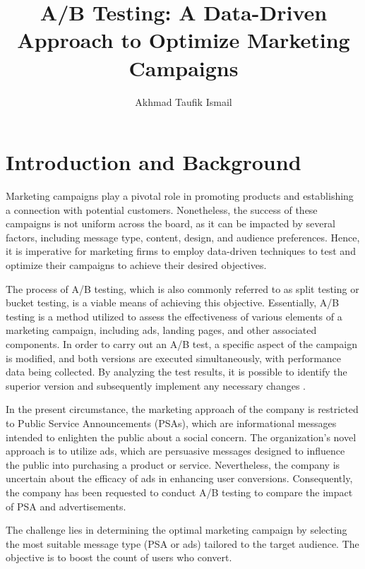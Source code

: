 \documentclass{article}
\begin{document}
\title{A/B Testing: A Data-Driven Approach to Optimize Marketing Campaigns}
\author{Akhmad Taufik Ismail}
\maketitle

\section{Introduction and Background} 

Marketing campaigns play a pivotal role in promoting products and establishing a connection with potential customers. Nonetheless, the success of these campaigns is not uniform across the board, as it can be impacted by several factors, including message type, content, design, and audience preferences. Hence, it is imperative for marketing firms to employ data-driven techniques to test and optimize their campaigns to achieve their desired objectives. 

The process of A/B testing, which is also commonly referred to as split testing or bucket testing, is a viable means of achieving this objective. Essentially, A/B testing is a method utilized to assess the effectiveness of various elements of a marketing campaign, including ads, landing pages, and other associated components. In order to carry out an A/B test, a specific aspect of the campaign is modified, and both versions are executed simultaneously, with performance data being collected. By analyzing the test results, it is possible to identify the superior version and subsequently implement any necessary changes \cite{a2019_how}. 

In the present circumstance, the marketing approach of the company is restricted to Public Service Announcements (PSAs), which are informational messages intended to enlighten the public about a social concern. The organization's novel approach is to utilize ads, which are persuasive messages designed to influence the public into purchasing a product or service. Nevertheless, the company is uncertain about the efficacy of ads in enhancing user conversions. Consequently, the company has been requested to conduct A/B testing to compare the impact of PSA and advertisements. 

The challenge lies in determining the optimal marketing campaign by selecting the most suitable message type (PSA or ads) tailored to the target audience. The objective is to boost the count of users who convert. 
\end{document}
